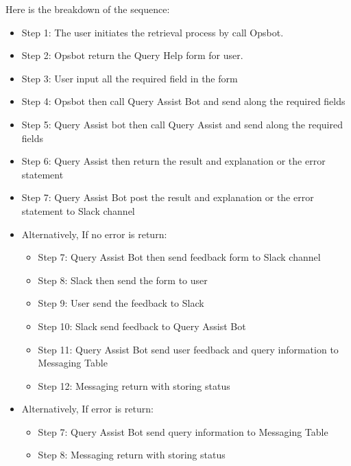     Here is the breakdown of the sequence:
    \begin{itemize}
        \item  Step 1: The user initiates the retrieval process by call Opsbot. 
        \item  Step 2: Opsbot return the Query Help form for user.
        \item  Step 3: User input all the required field in the form
        \item  Step 4: Opsbot then call Query Assist Bot and send along the required fields
        \item  Step 5: Query Assist bot then call Query Assist and send along the required fields
        \item  Step 6: Query Assist then return the result and explanation or the error statement 
        \item  Step 7: Query Assist Bot post the result and explanation or the error statement to Slack channel
        \item  Alternatively, If no error is return: 
        \begin{itemize}
            \item Step 7: Query Assist Bot then send feedback form to Slack channel
            \item Step 8: Slack then send the form to user
            \item Step 9: User send the feedback to Slack
            \item Step 10: Slack send feedback to Query Assist Bot
            \item Step 11: Query Assist Bot send user feedback and query information to Messaging Table
            \item Step 12: Messaging return with storing status
        \end{itemize}
        \item  Alternatively, If error is return:  
        \begin{itemize}
            \item Step 7: Query Assist Bot send query information to Messaging Table
            \item Step 8: Messaging return with storing status
        \end{itemize}
    \end{itemize}
